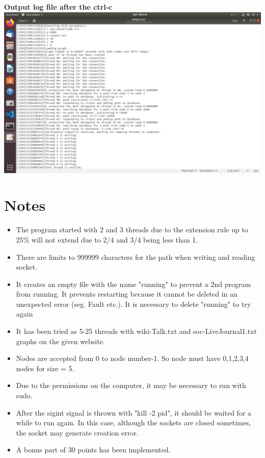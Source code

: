 \documentclass{article}
\begin{document}
\begin{center}
    \textbf{Output log file after the ctrl-c} \\
    \includegraphics[scale=0.32]{output.png}
\end{center}

\newpage

\section{Notes}
\begin{itemize}
    \item The program started with 2 and 3 threads due to the extension rule up to 25\% will not extend due to 2/4 and 3/4 being less than 1.
    \item There are limits to 999999 characters for the path when writing and reading socket.
    \item It creates an empty file with the name "running" to prevent a 2nd program from running. It prevents restarting because it cannot be deleted in an unexpected error (seg. Fault etc.). It is necessary to delete "running" to try again
    \item It has been tried as 5-25 threads with wiki-Talk.txt and soc-LiveJournal1.txt graphs on the given website.
    \item Nodes are accepted from 0 to node number-1. So node must have 0,1,2,3,4 nodes for size = 5.
    \item Due to the permissions on the computer, it may be necessary to run with sudo.
    \item After the sigint signal is thrown with "kill -2 pid", it should be waited for a while to run again. In this case, although the sockets are closed sometimes, the socket may generate creation error.
    \item A bonus part of 30 points has been implemented.
\end{itemize}
    
\end{document}
